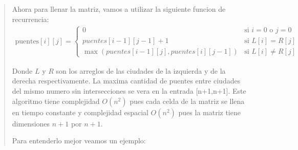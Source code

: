 \begin{quote}
    Ahora para llenar la matriz, vamos a utilizar la siguiente funcion de recurrencia: \vspace{.2cm}
    \begin{align*}
        \text{puentes}[i][j]=\begin{cases}
            0 & \text{si } i=0 \text{ o } j=0 \\
            puentes[i-1][j-1]+1 & \text{si } L[i]=R[j] \\
            \max(puentes[i-1][j],puentes[i][j-1]) & \text{si } L[i]\neq R[j]
        \end{cases}
    \end{align*}

    Donde $L$ y $R$ son los arreglos de las ciudades de la izquierda y de la derecha respectivamente. La maxima cantidad de puentes entre ciudades del mismo numero sin intersecciones se vera en la entrada [n+1,n+1]. Este algoritmo tiene complejidad $O(n^2)$ pues cada celda de la matriz se llena en tiempo constante y complejidad espacial $O(n^2)$ pues la matriz tiene dimensiones $n+1$ por $n+1$. \vspace{.2cm}

    Para entenderlo mejor veamos un ejemplo: \vspace{.2cm}


\end{quote}
